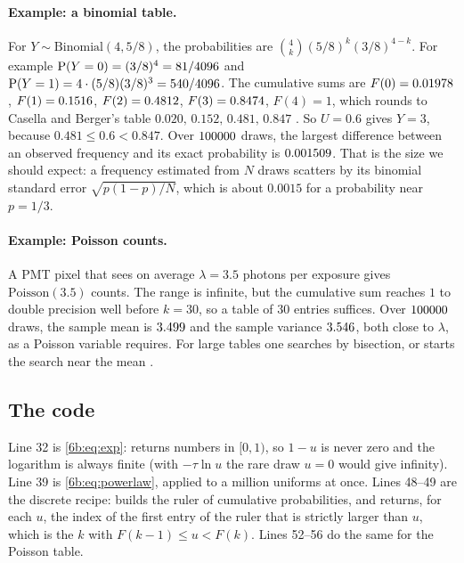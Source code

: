 \paragraph{Example: a binomial table.}
For $Y\sim\mathrm{Binomial}(4,5/8)$, the probabilities are
$\binom4k(5/8)^k(3/8)^{4-k}$. For example $\operatorname{P}(Y=0)=(3/8)^4=81/4096$ and
$\operatorname{P}(Y=1)=4\cdot(5/8)(3/8)^3=540/4096$. The cumulative sums are
$F(0)=0.01978$, $F(1)=0.1516$, $F(2)=0.4812$,
$F(3)=0.8474$, $F(4)=1$, which rounds to Casella and Berger's table
$0.020,\,0.152,\,0.481,\,0.847$ . So $U=0.6$ gives
$Y=3$, because $0.481\le0.6<0.847$. Over $100000$ draws, the largest difference
between an observed frequency and its exact probability is $0.001509$. That
is the size we should expect: a frequency estimated from $N$ draws scatters by its
binomial standard error $\sqrt{p(1-p)/N}$, which is about $0.0015$ for a
probability near $p=1/3$.

\paragraph{Example: Poisson counts.}
A PMT pixel that sees on average $\lambda=3.5$ photons per exposure gives
$\mathrm{Poisson}(3.5)$ counts. The range is infinite, but the cumulative sum
reaches $1$ to double precision well before $k=30$, so a table of $30$ entries
suffices. Over $100000$ draws, the sample mean is $3.499$ and the
sample variance $3.546$, both close to $\lambda$, as a Poisson variable
requires. For large tables one searches by bisection, or starts the search near the mean
.

\subsection{The code}
\label{6b:sec:inverse-code}


Line 32 is \eqref{6b:eq:exp}:  returns numbers in $[0,1)$, so
$1-u$ is never zero and the logarithm is always finite (with $-\tau\ln u$ the rare
draw $u=0$ would give infinity). Line 39 is \eqref{6b:eq:powerlaw}, applied to a
million uniforms at once. Lines 48--49 are the discrete recipe:
 builds the ruler of cumulative probabilities, and
 returns, for each $u$, the index of the
first entry of the ruler that is strictly larger than $u$, which is the $k$ with
$F(k-1)\le u<F(k)$. Lines 52--56 do the same for the Poisson table.

